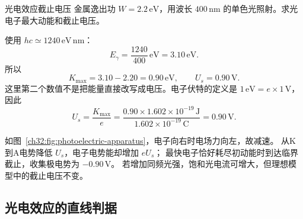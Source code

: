 \begin{origexamplebox}{光电效应截止电压}
金属逸出功 $W=2.2\,\mathrm{eV}$，用波长 $400\,\mathrm{nm}$ 的单色光照射。求光电子最大动能和截止电压。
\end{origexamplebox}
\begin{xesolution}
使用 $hc\simeq1240\,\mathrm{eV\,nm}$：
\[
 E_\gamma=\frac{1240}{400}\,\mathrm{eV}=3.10\,\mathrm{eV}.
\]
所以
\[
 K_{\max}=3.10-2.20=0.90\,\mathrm{eV},
 \qquad \boxed{U_s=0.90\,\mathrm V}.
\]
这里第二个数值不是把能量直接改写成电压。电子伏特的定义是
$1\,\mathrm{eV}=e\times1\,\mathrm V$，因此
\[
 U_s=\frac{K_{\max}}e
 =\frac{0.90\times1.602\times10^{-19}\,\mathrm J}
 {1.602\times10^{-19}\,\mathrm C}=0.90\,\mathrm V.
\]
\begin{center}

\label{ch32:fig:photoelectric-apparatus}
\end{center}
如图~\ref{ch32:fig:photoelectric-apparatus}，电子向右时电场力向左，故减速。
从K到A电势降低 $U_s$，电子电势能却增加 $eU_s$；
最快电子恰好耗尽初动能时到达临界截止，收集极电势为 $-0.90\,\mathrm V$。
若增加同频光强，饱和光电流可增大，但理想模型中的截止电压不变。
\end{xesolution}

\subsection{光电效应的直线判据}

